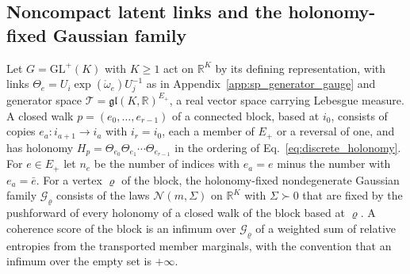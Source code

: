 \subsection{Noncompact latent links and the holonomy-fixed Gaussian family}\label{app:sp_holonomy_gaussian}
Let $G=\mathrm{GL}^+(K)$ with $K\geq1$ act on $\mathbb R^K$ by its defining representation, with links $\Theta_e=U_i\exp(\mathring\omega_e)U_j^{-1}$ as in Appendix~\ref{app:sp_generator_gauge} and generator space $\mathcal T=\mathfrak{gl}(K,\mathbb R)^{E_+}$, a real vector space carrying Lebesgue measure. A closed walk $p=(e_0,\ldots,e_{r-1})$ of a connected block, based at $i_0$, consists of copies $e_a:i_{a+1}\to i_a$ with $i_r=i_0$, each a member of $E_+$ or a reversal of one, and has holonomy $H_p=\Theta_{e_0}\Theta_{e_1}\cdots\Theta_{e_{r-1}}$ in the ordering of Eq.~\eqref{eq:discrete_holonomy}. For $e\in E_+$ let $n_e$ be the number of indices with $e_a=e$ minus the number with $e_a=\bar e$. For a vertex $\varrho$ of the block, the holonomy-fixed nondegenerate Gaussian family $\mathcal G_\varrho$ consists of the laws $\mathcal N(m,\Sigma)$ on $\mathbb R^K$ with $\Sigma\succ0$ that are fixed by the pushforward of every holonomy of a closed walk of the block based at $\varrho$. A coherence score of the block is an infimum over $\mathcal G_\varrho$ of a weighted sum of relative entropies from the transported member marginals, with the convention that an infimum over the empty set is $+\infty$.

